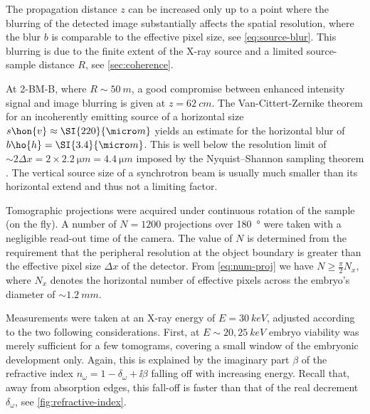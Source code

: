 \documentclass[
twoside,
openright,
titlepage,
numbers=noenddot,
headinclude,
fleqn,
a4paper,
footinclude=true,
cleardoublepage=empty,
abstractoff,
BCOR=5mm,
paper=a4,
fontsize=11pt,
british,ngerman,american,
]{scrreprt}
\begin{document}
The propagation distance $z$ can be increased only up to a point where
the blurring of the detected image substantially affects the spatial
resolution, \ie{} where the blur $b$ is comparable to the effective
pixel size, see \cref{eq:source-blur}.  This blurring is due to the
finite extent of the X-ray source and a limited source-sample distance
$R$, see \cref{sec:coherence}.

At 2-BM-B, where $R\sim\SI{50}{m}$, a good compromise between enhanced
intensity signal and image blurring is given at $z = \SI{62}{cm}$.
The Van-Cittert-Zernike theorem for an incoherently emitting source of
a horizontal size $s\hon{v}\approx\SI{220}{\micro m}$ yields an
estimate for the horizontal blur of $b\ho{h}=\SI{3.4}{\micro m}$.
This is well below the resolution limit of $\sim 2 \Delta x =
\num{2}\times\SI{2.2}{\micro m} = \SI{4.4}{\micro m}$ imposed by the
Nyquist–Shannon sampling theorem \cite{Nyquist1928,Shannon1949}.  The
vertical source size of a synchrotron beam is usually much smaller
than its horizontal extend and thus not a limiting factor.

Tomographic projections were acquired under continuous rotation of the
sample (on the fly).  A number of $N = \num{1200}$ projections over
\SI{180}{\degree} were taken with a negligible read-out time of the
camera.  The value of $N$ is determined from the requirement that the
peripheral resolution at the object boundary is greater than the
effective pixel size $\Delta x$ of the detector.  From
\cref{eq:num-proj} we have $N\ge\tfrac{\pi}{2}N_x$, where $N_x$
denotes the horizontal number of effective pixels across the embryo's
diameter of $\sim\SI{1.2}{mm}$.

Measurements were taken at an X-ray energy of $E = \SI{30}{keV}$,
adjusted according to the two following considerations.  First, at
$E\sim\num{20},\SI{25}{keV}$ embryo viability was merely sufficient
for a few tomograms, covering a small window of the embryonic
development only.  Again, this is explained by the imaginary part
$\beta$ of the refractive index $n_\omega = 1 - \delta_\omega +
\ii\beta$ falling off with increasing energy.  Recall that, away from
absorption edges, this fall-off is faster than that of the real
decrement $\delta_\omega$, see \cref{fig:refractive-index}.
\end{document}
